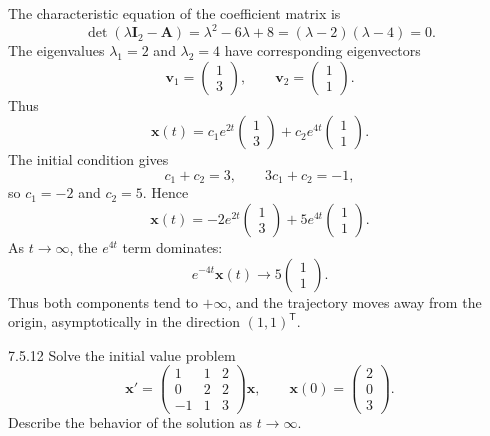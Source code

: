 \documentclass[11pt,oneside]{article}
\begin{document}
\begin{solution}
The characteristic equation of the coefficient matrix is
\[
    \det(\lambda\mathbf{I}_2-\mathbf{A})
    =\lambda^2-6\lambda+8=(\lambda-2)(\lambda-4)=0.
\]
The eigenvalues $\lambda_1=2$ and $\lambda_2=4$ have corresponding eigenvectors
\[
    \mathbf{v}_1=\begin{pmatrix}1\\3\end{pmatrix},
    \qquad
    \mathbf{v}_2=\begin{pmatrix}1\\1\end{pmatrix}.
\]
Thus
\[
    \mathbf{x}(t)
    =c_1e^{2t}\begin{pmatrix}1\\3\end{pmatrix}
     +c_2e^{4t}\begin{pmatrix}1\\1\end{pmatrix}.
\]
The initial condition gives
\[
    c_1+c_2=3,
    \qquad
    3c_1+c_2=-1,
\]
so $c_1=-2$ and $c_2=5$. Hence
\[
    \boxed{
        \mathbf{x}(t)
        =-2e^{2t}\begin{pmatrix}1\\3\end{pmatrix}
         +5e^{4t}\begin{pmatrix}1\\1\end{pmatrix}
    }.
\]
As $t\to\infty$, the $e^{4t}$ term dominates:
\[
    e^{-4t}\mathbf{x}(t)\longrightarrow
        5\begin{pmatrix}1\\1\end{pmatrix}.
\]
Thus both components tend to $+\infty$, and the trajectory moves away from the origin, asymptotically in the direction $(1,1)^{\mathsf T}$.
\end{solution}

\begin{problem}{7.5.12}
Solve the initial value problem
\[
    \mathbf{x}'=
    \begin{pmatrix}
        1&1&2\\
        0&2&2\\
        -1&1&3
    \end{pmatrix}\mathbf{x},
    \qquad
    \mathbf{x}(0)=\begin{pmatrix}2\\0\\3\end{pmatrix}.
\]
Describe the behavior of the solution as $t\to\infty$.
\end{problem}
\end{document}

